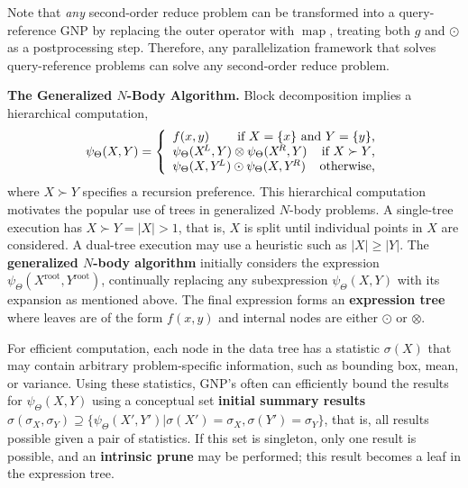\documentclass[times, leqno,twocolumn]{article}
\newcommand{\prefsplit}[2]{#1 \succ #2}
\newcommand{\summary}{\hat{\sigma}}
\DeclareMathOperator*{\map}{map}
\newcommand{\gnp}{\psi_{\Theta}}
\newcommand{\defterm}[1]{{\bf #1}}
\newcommand{\kdroot}[1]{#1^{\text{root}}}
\newcommand{\kdleft}[1]{#1^{\!L}}
\newcommand{\kdright}[1]{#1^{\!R}}
\newcommand{\outstat}{\sigma}
\begin{document}
Note that {\it any} second-order reduce problem can be transformed into a query-reference GNP by replacing the outer operator with $\map$, treating both $g$ and $\odot$ as a postprocessing step.
Therefore, any parallelization framework that solves query-reference problems can solve any second-order reduce problem.

{\bf The Generalized $N$-Body Algorithm.}
Block decomposition implies a hierarchical computation,
\[
\gnp(X,Y) = \left\{ \begin{array}{lrr}
    f(x,y) & \multicolumn{2}{r}{\text{if }X = \{x\}\text{ and }Y = \{y\}\text{,}}
    \\
    \multicolumn{2}{l}{\gnp(\kdleft{X},Y) \otimes \gnp(\kdright{X}, Y)} & \text{if }\prefsplit{X}{Y}\text{,}
    \\
    \multicolumn{2}{l}{\gnp(X,\kdleft{Y}) \odot \gnp(X,\kdright{Y})} & \text{otherwise,}
  \end{array}
\right.
\]
\noindent where $\prefsplit{X}{Y}$ specifies a recursion preference.
This hierarchical computation motivates the popular use of trees in generalized $N$-body problems.
A single-tree execution has $\prefsplit{X}{Y} = |X| > 1$, that is, $X$ is split until individual points in $X$ are considered.
A dual-tree execution may use a heuristic such as $|X| \geq |Y|$.
The \defterm{generalized $N$-body algorithm} initially considers the expression $\gnp(\kdroot{X}, \kdroot{Y})$, continually replacing any subexpression $\gnp(X, Y)$ with its expansion as mentioned above.
The final expression forms an \defterm{expression tree} where leaves are of the form $f(x,y)$ and internal nodes are either $\odot$ or $\otimes$.

For efficient computation, each node in the data tree has a statistic $\outstat(X)$ that may contain arbitrary problem-specific information, such as bounding box, mean, or variance.
Using these statistics, GNP's often can efficiently bound the results for $\gnp(X,Y)$ using a conceptual set \defterm{initial summary results} $\summary(\outstat_X,\outstat_Y) \supseteq \{\gnp(X',Y') | \outstat(X')\!\!=\!\!\outstat_X, \outstat(Y')\!\!=\!\!\outstat_Y\}$, that is, all results possible given a pair of statistics.
If this set is singleton, only one result is possible, and an \defterm{intrinsic prune} may be performed; this result becomes a leaf in the expression tree.
\end{document}
